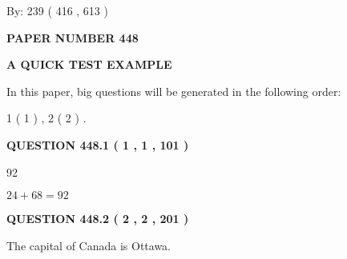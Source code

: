 \documentclass[12pt]{article}
\begin{document}
   
\hspace{1.0in} By: 
 239 ( 416 ,  613 )
   
   
   
   
\newpage 
\setcounter{page}{ 
   448001 } 
   
   
   
   
 {\textbf{ \Large{ PAPER NUMBER  448  }}}
   
   
\vspace{0.2in}
   
   
   
   
   
   
 \vspace{0.2in}
{\LARGE {\textbf{ A QUICK TEST EXAMPLE}}}
   
   
   
\vspace{0.2in}
   
In this paper, big questions will be generated in the following order: 
   
   
   1 ( 1 )
 ,
   2 ( 2 )
 .
  
\vspace{0.2in}
  
{\textbf{\Large{QUESTION
448.1 
 ( 1 , 1 , 101 )
}}}
  
  
 
 
\noindent{}

92
 
 
 
 
\noindent{}

$ %
24 +  %
68=   %
92$
 
 
  
\vspace{0.2in}
  
{\textbf{\Large{QUESTION
448.2 
 ( 2 , 2 , 201 )
}}}
  
  
 
 
\noindent{}
 
 
The capital of Canada is Ottawa.
 
 
 
 
   
   
 \vspace{0.2in}
 
\end{document}
